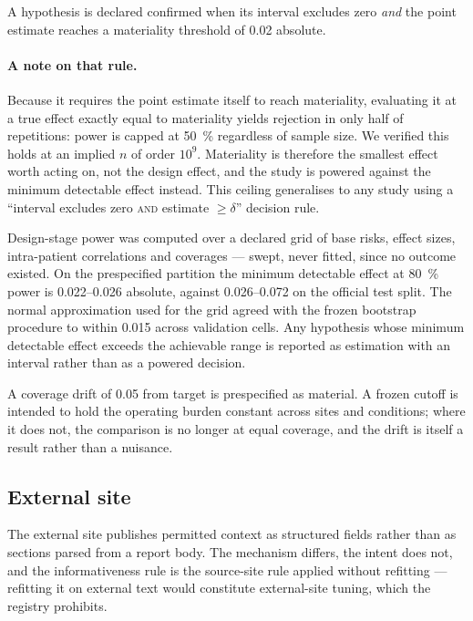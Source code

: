 A hypothesis is declared confirmed when its interval excludes zero \emph{and}
the point estimate reaches a materiality threshold of \num{0.02} absolute.

\paragraph{A note on that rule.} Because it requires the point estimate itself
to reach materiality, evaluating it at a true effect exactly equal to
materiality yields rejection in only half of repetitions: power is capped at
\SI{50}{\percent} regardless of sample size. We verified this holds at an
implied $n$ of order $10^{9}$. Materiality is therefore the smallest effect
worth acting on, not the design effect, and the study is powered against the
minimum detectable effect instead. This ceiling generalises to any study using a
``interval excludes zero \textsc{and} estimate $\geq \delta$'' decision rule.

Design-stage power was computed over a declared grid of base risks, effect
sizes, intra-patient correlations and coverages --- swept, never fitted, since
no outcome existed. On the prespecified partition the minimum detectable effect
at \SI{80}{\percent} power is \numrange{0.022}{0.026} absolute, against
\numrange{0.026}{0.072} on the official test split. The normal approximation
used for the grid agreed with the frozen bootstrap procedure to within
\num{0.015} across validation cells. Any hypothesis whose minimum detectable
effect exceeds the achievable range is reported as estimation with an interval
rather than as a powered decision.

A coverage drift of \num{0.05} from target is prespecified as material. A frozen
cutoff is intended to hold the operating burden constant across sites and
conditions; where it does not, the comparison is no longer at equal coverage,
and the drift is itself a result rather than a nuisance.

\subsection{External site}

The external site publishes permitted context as structured fields rather than
as sections parsed from a report body. The mechanism differs, the intent does
not, and the informativeness rule is the source-site rule applied without
refitting --- refitting it on external text would constitute external-site
tuning, which the registry prohibits.

